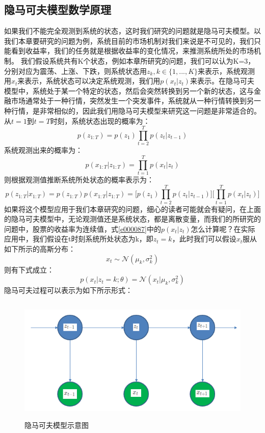 \documentclass{article}
\begin{document}
\subsection{隐马可夫模型数学原理}
如果我们不能完全观测到系统的状态，这时我们研究的问题就是隐马可夫模型。以我们本章要研究的问题为例，系统目前的市场机制对我们来说是不可见的，我们只能看到收益率，我们的任务就是根据收益率的变化情况，来推测系统所处的市场机制。\newline
我们假设系统共有K个状态，例如本章所研究的问题，我们可以认为K=3，分别对应为震荡、上涨、下跌，则系统状态用$z_{k},k \in \{1,..., K\}$来表示，系统观测用$x_{t}$来表示，系统状态可以决定系统观测，我们用$p(x_{t} \vert z_{t})$来表示。在隐马可夫模型中，系统处于某一个特定的状态，然后会突然转换到另一个新的状态，这与金融市场通常处于一种行情，突然发生一个突发事件，系统就从一种行情转换到另一种行情，是非常相似的，因此我们用隐马可夫模型来研究这一问题是非常适合的。
从$t=1$到$t=T$时刻，系统状态出现的概率为：
\begin{equation}
p(z_{1:T}) = p(z_{1}) \prod_{t=2}^{T}p(z_{t} \vert z_{t-1})
\label{e000085}
\end{equation}
系统观测出来的概率为：
\begin{equation}
p(x_{1:T} \vert z_{1:T}) = \prod_{t=1}^{T} p(x_{t} \vert z_{t})
\label{e000086}
\end{equation}
则根据观测值推断系统所处状态的概率表示为：
\begin{equation}
p(z_{1:T} \vert x_{1:T}) = p(z_{1:T}) p(x_{1:T} \vert z_{1:T}) = \bigg[ p(z_{1}) \prod_{t=2}^{T}p(z_{t} \vert z_{t-1}) \bigg] \bigg[ \prod_{t=1}^{T} p(x_{t} \vert z_{t}) \bigg]
\label{e000087}
\end{equation}
如果将这个模型应用于我们本章研究的问题，细心的读者可能就会有疑问，在上面的隐马可夫模型中，无论观测值还是系统状态，都是离散变量，而我们的所研究的问题中，股票的收益率为连续值，式\ref{e000087}中的$p(x_{t} \vert z_{t})$怎么计算呢？在实际应用中，我们假设在t时刻系统所处状态为k，即$z_{t}=k$，此时我们可以假设$x_{t}$服从如下所示的高斯分布：
\begin{equation}
x_{t} \sim \mathcal{N}(\mu _{k}, \sigma _{k}^{2})
\label{e000088}
\end{equation}
则有下式成立：
\begin{equation}
p(x_{t} \vert z_{t}=k; \theta) = \mathcal{N} (x_{t} \vert \mu _{k}, \sigma _{k}^{2})
\label{e000089}
\end{equation}
隐马可夫过程可以表示为如下所示形式：
\begin{figure}[H]
	\caption{隐马可夫模型示意图}
	\label{f000069}
	\centering
	\includegraphics[height=6cm]{images/f000069}
\end{figure}
\end{document}
